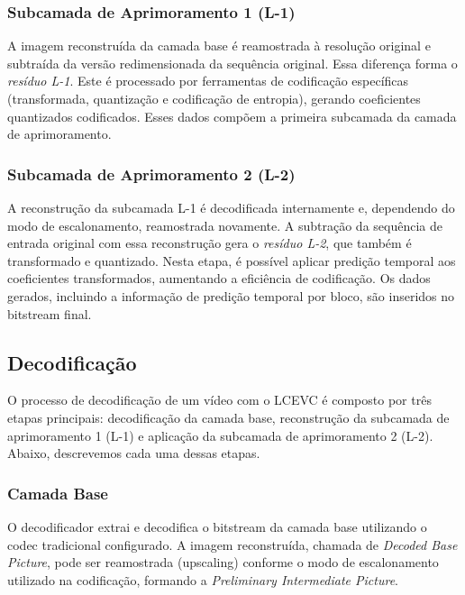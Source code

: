 \subsubsection{Subcamada de Aprimoramento 1 (L-1)}

A imagem reconstruída da camada base é reamostrada à resolução original e subtraída da
versão redimensionada da sequência original. Essa diferença forma o \textit{resíduo L-1}. 
Este é processado por ferramentas de codificação específicas (transformada, quantização e 
codificação de entropia), gerando coeficientes quantizados codificados. 
Esses dados compõem a primeira subcamada da camada de aprimoramento. \cite{MPEG2022LCEVC,
overview_lcevc}

\subsubsection{Subcamada de Aprimoramento 2 (L-2)}

A reconstrução da subcamada L-1 é decodificada internamente e, dependendo do modo de escalonamento, 
reamostrada novamente. A subtração da sequência de entrada original com essa reconstrução gera o 
\textit{resíduo L-2}, que também é transformado e quantizado. Nesta etapa, é possível aplicar 
predição temporal aos coeficientes transformados, aumentando a eficiência de codificação. Os dados 
gerados, incluindo a informação de predição temporal por bloco, são inseridos no bitstream final. 
\cite{MPEG2022LCEVC, overview_lcevc}

\subsection{Decodificação}

%

O processo de decodificação de um vídeo com o \acrshort{LCEVC} é composto por três etapas principais: 
decodificação da camada base, reconstrução da subcamada de aprimoramento 1 (L-1) e aplicação da subcamada 
de aprimoramento 2 (L-2). Abaixo, descrevemos cada uma dessas etapas.

\subsubsection{Camada Base}

O decodificador extrai e decodifica o bitstream da camada base utilizando o codec tradicional configurado. 
A imagem reconstruída, chamada de \textit{Decoded Base Picture}, pode ser reamostrada (upscaling) conforme 
o modo de escalonamento utilizado na codificação, formando a \textit{Preliminary Intermediate Picture}.
\cite{MPEG2022LCEVC, overview_lcevc}

